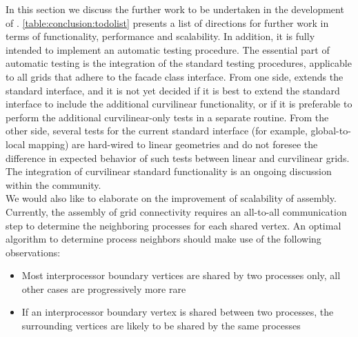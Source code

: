 
\noindent
In this section we discuss the further work to be undertaken in the development of \curvgrid{}. \cref{table:conclusion:todolist} presents a list of directions for further work in terms of functionality, performance and scalability. In addition, it is fully intended to implement an automatic \curvgrid{} testing procedure. The essential part of automatic testing is the integration of the standard \dunegrid{} testing procedures, applicable to all grids that adhere to the facade class interface. From one side, \curvgrid{} extends the standard \dunegrid{} interface, and it is not yet decided if it is best to extend the standard interface to include the additional curvilinear functionality, or if it is preferable to perform the additional curvilinear-only tests in a separate routine. From the other side, several tests for the current standard interface (for example, global-to-local mapping) are hard-wired to linear geometries and do not foresee the difference in expected behavior of such tests between linear and curvilinear grids. The integration of curvilinear standard functionality is an ongoing discussion within the \dune{} community. \\

\noindent
We would also like to elaborate on the improvement of scalability of \curvgrid{} assembly. Currently, the assembly of grid connectivity requires an all-to-all communication step to determine the neighboring processes for each shared vertex. An optimal algorithm to determine process neighbors should make use of the following observations:
\begin{itemize}
 \item Most interprocessor boundary vertices are shared by two processes only, all other cases are progressively more rare
 \item If an interprocessor boundary vertex is shared between two processes, the surrounding vertices are likely to be shared by the same processes
\end{itemize}

